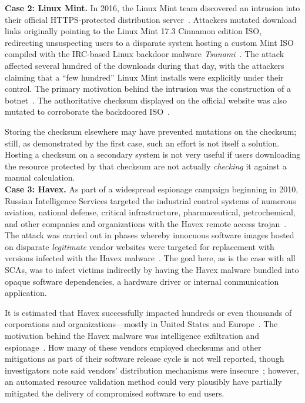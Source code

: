 \noindent\textbf{Case 2: Linux Mint.} In 2016, the Linux Mint team discovered an
intrusion into their official HTTPS-protected distribution
server~\cite{SCA-MINT1}. Attackers mutated download links originally pointing to
the Linux Mint 17.3 Cinnamon edition ISO, redirecting unsuspecting users to a
disparate system hosting a custom Mint ISO compiled with the IRC-based Linux
backdoor malware \emph{Tsunami}~\cite{SCA-MINT2}. The attack affected several
hundred of the downloads during that day, with the attackers claiming that a
``few hundred'' Linux Mint installs were explicitly under their control. The
primary motivation behind the intrusion was the construction of a
botnet~\cite{SCA-MINT3}. The authoritative checksum displayed on the official
website was also mutated to corroborate the backdoored ISO~\cite{SCA-MINT3}.

Storing the checksum elsewhere may have prevented mutations on the checksum;
still, as demonstrated by the first case, such an effort is not itself a
solution. Hosting a checksum on a secondary system is not very useful if users
downloading the resource protected by that checksum are not actually
\emph{checking} it against a manual calculation. \\

\noindent\textbf{Case 3: Havex.} As part of a widespread espionage campaign
beginning in 2010, Russian Intelligence Services targeted the industrial control
systems of numerous aviation, national defense, critical infrastructure,
pharmaceutical, petrochemical, and other companies and organizations with the
Havex remote access trojan~\cite{SCA-HAVEX1, SCA-HAVEX2}. The attack was carried
out in phases whereby innocuous software images hosted on disparate
\emph{legitimate} vendor websites were targeted for replacement with versions
infected with the Havex malware~\cite{SCA-HAVEX2}. The goal here, as is the case
with all SCAs, was to infect victims indirectly by having the Havex malware
bundled into opaque software dependencies, \ie a hardware driver or internal
communication application.

It is estimated that Havex successfully impacted hundreds or even thousands of
corporations and organizations---mostly in United States and 
Europe~\cite{SCA-HAVEX2}. The motivation behind the Havex malware was
intelligence exfiltration and espionage~\cite{SCA-HAVEX1}. How many of these
vendors employed checksums and other mitigations as part of their software
release cycle is not well reported, though investigators note said vendors'
distribution mechanisms were insecure~\cite{SCA-HAVEX2}; however, an automated
resource validation method could very plausibly have partially mitigated the
delivery of compromised software to end users. \\

